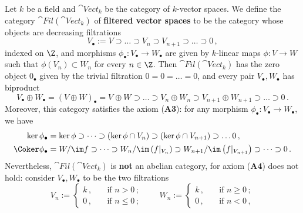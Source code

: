 \begin{ex}
    Let $k$ be a field and $\cat{Vect}_{k}$ be the
    category of $k$-vector spaces.
    We define the category $\cat{Fil}(\cat{Vect}_{k})$ 
    of \textbf{filtered vector spaces}
    to be the category whose objects are decreasing filtrations
    \begin{equation*}
        V_{\bullet} := V  \supset \dots \supset V_{n} 
        \supset V_{n+1} \supset \dots \supset 0\,,
    \end{equation*}
    indexed on $\Z$, and morphisms 
    $\phi_{\bullet} : V_{\bullet} \to W_{\bullet}$ 
    are given by $k$-linear maps $\phi : V \to W$
    such that $\phi(V_{n}) \subset W_{n}$ for every $n \in \Z$.
    Then $\cat{Fil}(\cat{Vect}_{k})$ has the zero object
    $0_{\bullet}$ given by the trivial
    filtration $0 = 0 = \dots = 0$,
    and every pair $V_{\bullet}, W_{\bullet}$ has biproduct
    \begin{equation*}
        V_{\bullet} \oplus W_{\bullet} 
        = (V \oplus W)_{\bullet} 
        = V_{} \oplus W_{} \supset \dots \supset V_{n} \oplus W_{n}
        \supset V_{n+1} \oplus W_{n+1} \supset \dots \supset 0\,.
    \end{equation*}
    Moreover, this category satisfies the axiom (\textbf{A3}):
    for any morphism $\phi_{\bullet} : V_{\bullet} \to W_{\bullet}$,
    we have
    \begin{align*}
        \ker \phi_{\bullet} &= \ker \phi \supset \dots \supset (\ker \phi \cap V_{n}) 
        \supset (\ker \phi \cap V_{n+1}) \supset \dots 0\,,\\
        \Coker \phi_{\bullet} &= W/\im f \supset \dots \supset W_{n}/\im\left(f\vert_{V_{n}}\right)
        \supset W_{n+1}/\im \left(f\vert_{V_{n+1}} \right) \supset \dots \supset 0\,.
    \end{align*}
    Nevertheless, $\cat{Fil}(\cat{Vect}_{k})$ is \textbf{not}
    an abelian category, for axiom (\textbf{A4}) does not hold:
    consider $V_{\bullet}, W_{\bullet}$ to be the two filtrations
    \begin{equation*}
        V_{n} := \begin{cases}
            k\,, \quad &\text{if } n>0\,;\\
            0\,, \quad &\text{if } n \le 0\,;
        \end{cases}
        \qquad
        W_{n} := \begin{cases}
            k\,, \quad &\text{if } n\ge0\,;\\
            0\,, \quad &\text{if } n < 0\,,

\end{cases}
\end{equation*}
\end{ex}
